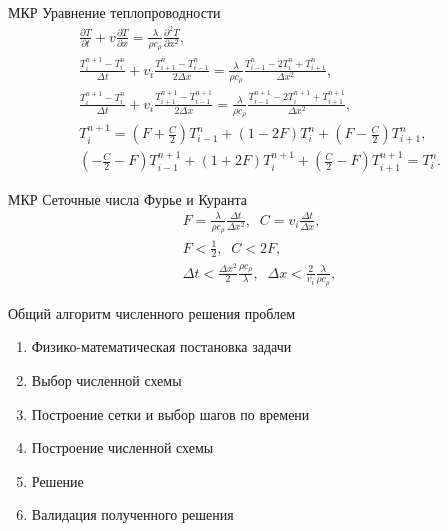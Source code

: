 \documentclass[12pt]{beamer}
\begin{document}
\begin{frame}{МКР Уравнение теплопроводности}
    \begin{eqnarray}
        \frac{\partial T}{\partial t} + v \frac{\partial T}{\partial x}  =  \frac{\lambda}{\rho c_{\rho}} \frac{\partial^2 T}{\partial x^2},\\
        \frac{T_i^{n+1} - T_i^{n}}{\Delta t} + v_{i}\frac{T_{i+1}^{n}-T_{i-1}^{n}}{2\Delta x} =  \frac{\lambda}{\rho c_{\rho}}\frac{T_{i-1}^{n} - 2T_i^{n} + T_{i+1}^{n}}{\Delta x^2},\\
        \frac{T_i^{n+1} - T_i^{n}}{\Delta t} + v_{i}\frac{T_{i+1}^{n+1}-T_{i-1}^{n+1}}{2\Delta x} =  \frac{\lambda}{\rho c_{\rho}}\frac{T_{i-1}^{n+1} - 2T_i^{n+1} + T_{i+1}^{n+1}}{\Delta x^2},\\       
        T_i^{n+1} = \left(F + \frac{C}{2} \right) T_{i-1}^{n} + \left(1 - 2F \right) T_i^{n} + \left(F - \frac{C}{2} \right) T_{i+1}^{n},\\
        \left(-\frac{C}{2} - F \right) T_{i-1}^{n+1} + \left(1 + 2F \right) T_i^{n+1} + \left(\frac{C}{2} - F \right) T_{i+1}^{n+1} = T_i^{n}.
    \end{eqnarray}
\end{frame}

\begin{frame}{МКР Сеточные числа Фурье и Куранта}
    \begin{eqnarray}
        F = \frac{\lambda}{\rho c_{\rho}} \frac{\Delta t}{\Delta x^2}, \; \; C = v_{i} \frac{\Delta t}{\Delta x},\\
        F < \frac{1}{2}, \; \; C < 2F,\\
        \Delta t < \frac{\Delta x^2}{2} \frac{\rho c_{\rho}}{\lambda}, \; \; \Delta x < \frac{2}{v_{i}} \frac{\lambda}{\rho c_{\rho}},
    \end{eqnarray}
\end{frame}

\begin{frame}{Общий алгоритм численного решения проблем}
    \begin{enumerate}
        \item Физико-математическая постановка задачи
        \vspace{0.2 cm} 
        \item Выбор численной схемы
        \vspace{0.2 cm}
        \item Построение сетки и выбор шагов по времени
        \vspace{0.2 cm}
        \item Построение численной схемы
        \vspace{0.2 cm}
        \item  Решение
        \vspace{0.2 cm}
        \item Валидация полученного решения
    \end{enumerate}
\end{frame}
\end{document}

